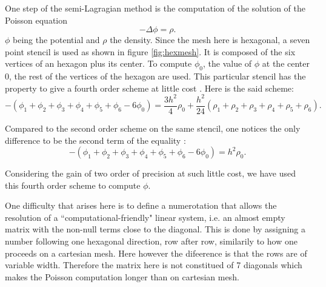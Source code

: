 \documentclass[proc]{edpsmath}
\begin{document}

One step of the semi-Lagragian method is the computation of the solution of the Poisson equation
\begin{equation*}
	- \Delta \phi = \rho .
\end{equation*}
 $\phi$ being the potential and $\rho$ the density.
Since the mesh here is hexagonal, a seven point stencil is used as shown in figure \ref{fig:hexmesh}. It is composed of the six vertices of an hexagon plus its center. To compute  $\phi_0$, the value of $\phi$ at the center $0$, the rest of the vertices of the hexagon are used. 
 This particular stencil has the property to give a fourth order scheme at little cost \cite{poisson}. Here is the said scheme:
\begin{equation*}
-(\phi_1 + \phi_2 + \phi_3 + \phi_4 +\phi_5 + \phi_6 - 6 \phi_0)  = \frac{3h^2}{4} \rho_0 + \frac{h^2}{24}(\rho_1+\rho_2+\rho_3+\rho_4+\rho_5+\rho_6).
\end{equation*} 

Compared to the second order scheme on the same stencil, one notices the only difference to be the second term of the equality :  
\begin{equation*}
-(\phi_1 + \phi_2 + \phi_3 + \phi_4 +\phi_5 + \phi_6 - 6 \phi_0)  = h^2 \rho_0.
\end{equation*} 

Considering the gain of two order of precision at such little cost, we have used this fourth order scheme to compute $\phi$.

 \rmrk One difficulty that arises here is to define a numerotation that allows the resolution of a ``computational-friendly" linear system, i.e. an almost empty matrix with the non-null terms close to the diagonal. This is done by assigning a number following one hexagonal direction, row after row, similarily to how one proceeds on a cartesian mesh. Here however the difeerence is that the rows are of variable width. Therefore the matrix here is not constitued of 7 diagonals which makes the Poisson computation longer than on cartesian mesh.  

\end{document}
